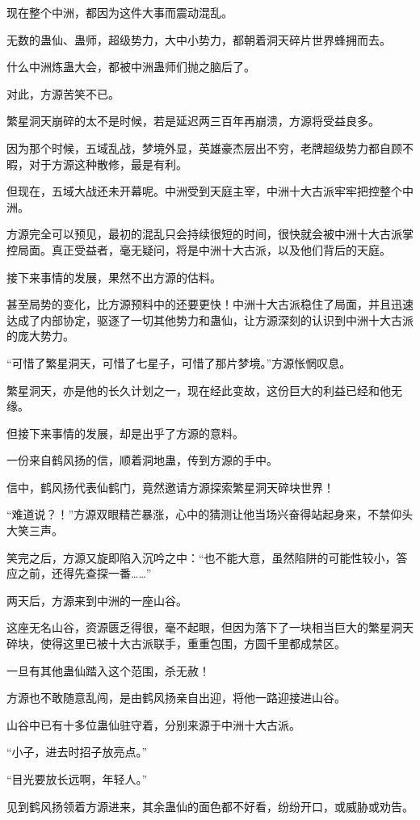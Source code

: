 \begin{this_body}
现在整个中洲，都因为这件大事而震动混乱。

无数的蛊仙、蛊师，超级势力，大中小势力，都朝着洞天碎片世界蜂拥而去。

什么中洲炼蛊大会，都被中洲蛊师们抛之脑后了。

对此，方源苦笑不已。

繁星洞天崩碎的太不是时候，若是延迟两三百年再崩溃，方源将受益良多。

因为那个时候，五域乱战，梦境外显，英雄豪杰层出不穷，老牌超级势力都自顾不暇，对于方源这种散修，最是有利。

但现在，五域大战还未开幕呢。中洲受到天庭主宰，中洲十大古派牢牢把控整个中洲。

方源完全可以预见，最初的混乱只会持续很短的时间，很快就会被中洲十大古派掌控局面。真正受益者，毫无疑问，将是中洲十大古派，以及他们背后的天庭。

接下来事情的发展，果然不出方源的估料。

甚至局势的变化，比方源预料中的还要更快！中洲十大古派稳住了局面，并且迅速达成了内部协定，驱逐了一切其他势力和蛊仙，让方源深刻的认识到中洲十大古派的庞大势力。

“可惜了繁星洞天，可惜了七星子，可惜了那片梦境。”方源怅惘叹息。

繁星洞天，亦是他的长久计划之一，现在经此变故，这份巨大的利益已经和他无缘。

但接下来事情的发展，却是出乎了方源的意料。

一份来自鹤风扬的信，顺着洞地蛊，传到方源的手中。

信中，鹤风扬代表仙鹤门，竟然邀请方源探索繁星洞天碎块世界！

“难道说？！”方源双眼精芒暴涨，心中的猜测让他当场兴奋得站起身来，不禁仰头大笑三声。

笑完之后，方源又旋即陷入沉吟之中：“也不能大意，虽然陷阱的可能性较小，答应之前，还得先查探一番……”

两天后，方源来到中洲的一座山谷。

这座无名山谷，资源匮乏得很，毫不起眼，但因为落下了一块相当巨大的繁星洞天碎块，使得这里已被十大古派联手，重重包围，方圆千里都成禁区。

一旦有其他蛊仙踏入这个范围，杀无赦！

方源也不敢随意乱闯，是由鹤风扬亲自出迎，将他一路迎接进山谷。

山谷中已有十多位蛊仙驻守着，分别来源于中洲十大古派。

“小子，进去时招子放亮点。”

“目光要放长远啊，年轻人。”

见到鹤风扬领着方源进来，其余蛊仙的面色都不好看，纷纷开口，或威胁或劝告。


\end{this_body}
